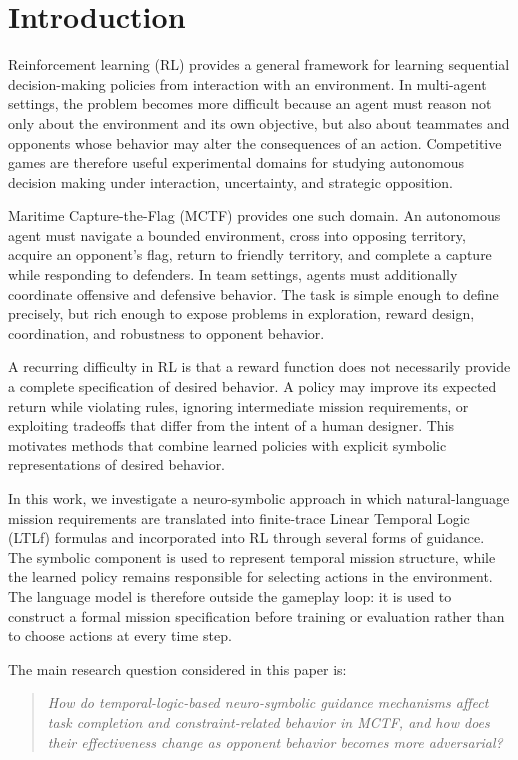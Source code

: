 \documentclass[letterpaper]{article}
\begin{document}
\section{Introduction}

Reinforcement learning (RL) provides a general framework for learning sequential decision-making policies from interaction with an environment. In multi-agent settings, the problem becomes more difficult because an agent must reason not only about the environment and its own objective, but also about teammates and opponents whose behavior may alter the consequences of an action. Competitive games are therefore useful experimental domains for studying autonomous decision making under interaction, uncertainty, and strategic opposition.

Maritime Capture-the-Flag (MCTF) provides one such domain. An autonomous agent must navigate a bounded environment, cross into opposing territory, acquire an opponent's flag, return to friendly territory, and complete a capture while responding to defenders. In team settings, agents must additionally coordinate offensive and defensive behavior. The task is simple enough to define precisely, but rich enough to expose problems in exploration, reward design, coordination, and robustness to opponent behavior.

A recurring difficulty in RL is that a reward function does not necessarily provide a complete specification of desired behavior. A policy may improve its expected return while violating rules, ignoring intermediate mission requirements, or exploiting tradeoffs that differ from the intent of a human designer. This motivates methods that combine learned policies with explicit symbolic representations of desired behavior.

In this work, we investigate a neuro-symbolic approach in which natural-language mission requirements are translated into finite-trace Linear Temporal Logic (LTLf) formulas and incorporated into RL through several forms of guidance. The symbolic component is used to represent temporal mission structure, while the learned policy remains responsible for selecting actions in the environment. The language model is therefore outside the gameplay loop: it is used to construct a formal mission specification before training or evaluation rather than to choose actions at every time step.

The main research question considered in this paper is:

\begin{quote}
\textit{How do temporal-logic-based neuro-symbolic guidance mechanisms affect task completion and constraint-related behavior in MCTF, and how does their effectiveness change as opponent behavior becomes more adversarial?}
\end{quote}
\end{document}
